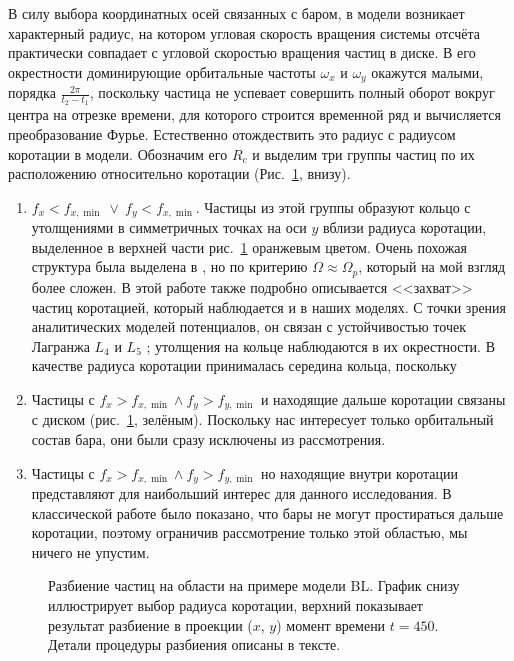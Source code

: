 \documentclass[tikz]{trlnotes}
\begin{document}
В силу выбора координатных осей связанных с баром, в модели возникает характерный радиус, на котором
угловая скорость вращения системы отсчёта практически совпадает с угловой скоростью вращения частиц в диске.
В его окрестности доминирующие орбитальные частоты $\omega_x$ и $\omega_y$ окажутся малыми, порядка $\frac{2\pi}{t_2
- t_1}$, поскольку частица не успевает совершить полный оборот вокруг центра на отрезке времени, для которого
строится временной ряд и вычисляется преобразование Фурье. Естественно отождествить это радиус с радиусом
коротации в модели. Обозначим его $R_c$ и выделим три группы частиц по их расположению относительно коротации
(Рис.~\ref{fig:disksplit}, внизу).
\begin{enumerate}
  \item $f_x < f_{x, \min} \:\lor\: f_y < f_{x, \min}$. Частицы из этой группы образуют кольцо с утолщениями в
    симметричных точках на оси $y$ вблизи радиуса коротации, выделенное в верхней части рис.~\ref{fig:disksplit}
    оранжевым цветом.
    Очень похожая структура была выделена в \citet{ceverino2007}, но по критерию $Ω \approx Ω_p$, который на мой
    взгляд более сложен. В этой работе также подробно описывается <<захват>> частиц коротацией, который
    наблюдается и в наших моделях. С точки зрения аналитических моделей потенциалов, он связан с устойчивостью
    точек Лагранжа $L_4$ и
    $L_5$ \citep[Fig.~3.14]{2008gady.book.....B}; утолщения на кольце наблюдаются в их окрестности.
    В качестве радиуса коротации принималась середина кольца, поскольку 
  \item Частицы с $f_x > f_{x, \min} \land f_y > f_{y, \min}$ и находящие дальше коротации связаны с диском
    (рис.~\ref{fig:disksplit}, зелёным). Поскольку нас интересует только орбитальный состав бара, они были сразу исключены из
    рассмотрения. 
  \item Частицы с $f_x > f_{x, \min} \land f_y > f_{y, \min}$ но находящие внутри коротации представляют для
    наибольший интерес для данного исследования. В классической работе \citet{contopoulos1980} было показано, что
    бары не могут простираться дальше коротации, поэтому ограничив рассмотрение только этой областью, мы ничего не
    упустим.
\end{enumerate}

\begin{figure}[htpb]
  \centering
  \par
  \caption{Разбиение частиц на области на примере модели BL. График снизу иллюстрирует выбор радиуса коротации,
  верхний показывает результат разбиение в проекции ($x$, $y$) момент времени $t=450$.
Детали процедуры разбиения описаны в тексте.}%
  \label{fig:disksplit}
\end{figure}
\end{document}
